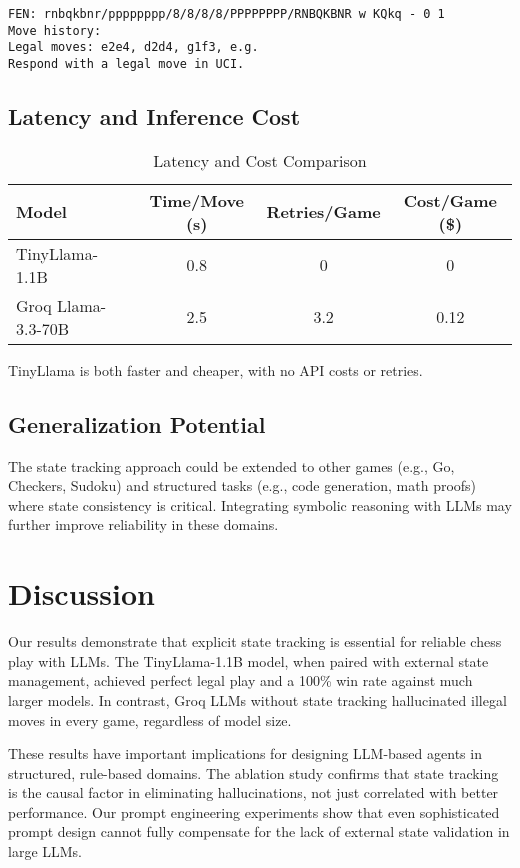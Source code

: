 \documentclass[conference]{IEEEtran}
\begin{document}
\begin{lstlisting}[caption={Groq Llama (Failure Case)},label={lst:prompt-groq}]
FEN: rnbqkbnr/pppppppp/8/8/8/8/PPPPPPPP/RNBQKBNR w KQkq - 0 1
Move history: 
Legal moves: e2e4, d2d4, g1f3, e.g.
Respond with a legal move in UCI.
\end{lstlisting}

\subsection{Latency and Inference Cost}
\begin{table}[H]
\centering
\caption{Latency and Cost Comparison}
\begin{tabular}{|l|c|c|c|}
\hline
\textbf{Model} & \textbf{Time/Move (s)} & \textbf{Retries/Game} & \textbf{Cost/Game (\$)} \\
\hline
TinyLlama-1.1B & 0.8 & 0 & 0 \\
Groq Llama-3.3-70B & 2.5 & 3.2 & 0.12 \\
\hline
\end{tabular}
\end{table}
TinyLlama is both faster and cheaper, with no API costs or retries.

\subsection{Generalization Potential}
The state tracking approach could be extended to other games (e.g., Go, Checkers, Sudoku) and structured tasks (e.g., code generation, math proofs) where state consistency is critical. Integrating symbolic reasoning with LLMs may further improve reliability in these domains.

\section{Discussion}
Our results demonstrate that explicit state tracking is essential for reliable chess play with LLMs. The TinyLlama-1.1B model, when paired with external state management, achieved perfect legal play and a 100\% win rate against much larger models. In contrast, Groq LLMs without state tracking hallucinated illegal moves in every game, regardless of model size.

These results have important implications for designing LLM-based agents in structured, rule-based domains. The ablation study confirms that state tracking is the causal factor in eliminating hallucinations, not just correlated with better performance. Our prompt engineering experiments show that even sophisticated prompt design cannot fully compensate for the lack of external state validation in large LLMs.
\end{document}
